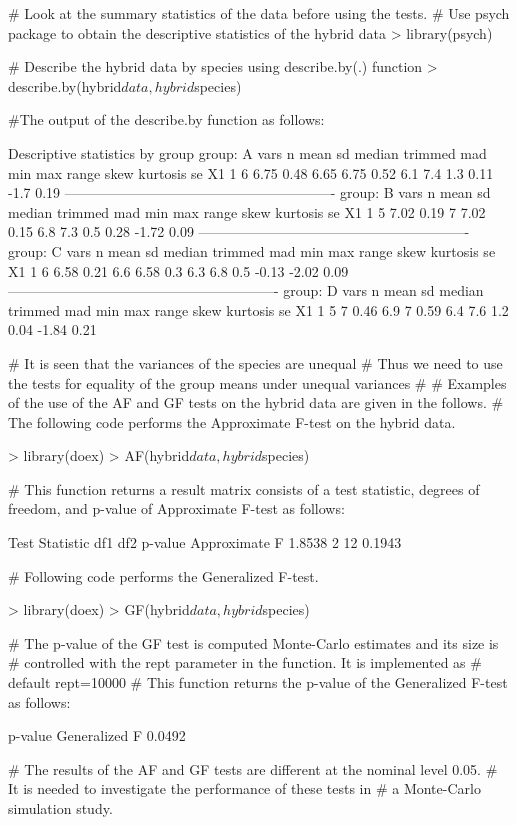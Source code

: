 \begin{example}
# Look at the summary statistics of the data before using the tests.
# Use psych package to obtain the descriptive statistics of the hybrid data
> library(psych)

# Describe the hybrid data by species using describe.by(.) function
> describe.by(hybrid$data, hybrid$species)

#The output of the describe.by function as follows:

Descriptive statistics by group 
group: A
   vars n mean   sd median trimmed  mad min max range skew kurtosis   se
X1    1 6 6.75 0.48   6.65    6.75 0.52 6.1 7.4   1.3 0.11     -1.7 0.19
---------------------------------------------------------- 
group: B
   vars n mean   sd median trimmed  mad min max range skew kurtosis   se
X1    1 5 7.02 0.19      7    7.02 0.15 6.8 7.3   0.5 0.28    -1.72 0.09
---------------------------------------------------------- 
group: C
   vars n mean   sd median trimmed mad min max range  skew kurtosis   se
X1    1 6 6.58 0.21    6.6    6.58 0.3 6.3 6.8   0.5 -0.13    -2.02 0.09
---------------------------------------------------------- 
group: D
   vars n mean   sd median trimmed  mad min max range skew kurtosis   se
X1    1 5    7 0.46    6.9       7 0.59 6.4 7.6   1.2 0.04    -1.84 0.21

# It is seen that the variances of the species are unequal
# Thus we need to use the tests for equality of the group means under unequal variances
#
# Examples of the use of the AF and GF tests on the hybrid data are given in the follows.
# The following code performs the Approximate F-test on the hybrid data.

> library(doex)
> AF(hybrid$data,hybrid$species)

# This function returns a result matrix consists of a test statistic, degrees of freedom, 
and p-value of Approximate F-test as follows:

              Test Statistic df1 df2 p-value
Approximate F         1.8538   2  12  0.1943
\end{example}

\begin{example}
# Following code performs the Generalized F-test.

> library(doex)
> GF(hybrid$data,hybrid$species)

# The p-value of the GF test is computed Monte-Carlo estimates and its size is 
# controlled with the rept parameter in the function. It is implemented as 
# default rept=10000
# This function returns the p-value of the Generalized F-test as follows:

              p-value
Generalized F  0.0492

# The results of the AF and GF tests are different at the nominal level 0.05.
# It is needed to investigate the performance of these tests in 
# a Monte-Carlo simulation study.
\end{example}

